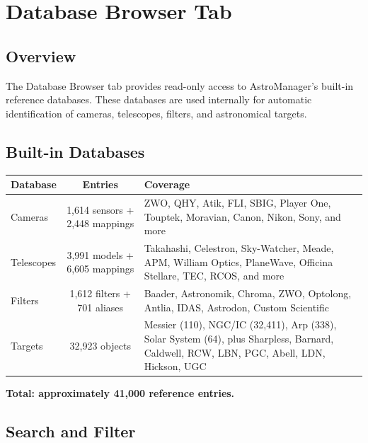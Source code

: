 \documentclass[11pt,a4paper]{article}
\begin{document}
\section{Database Browser Tab}
\label{sec:database}

\subsection{Overview}

The Database Browser tab provides read-only access to AstroManager's built-in reference databases. These databases are used internally for automatic identification of cameras, telescopes, filters, and astronomical targets.

\subsection{Built-in Databases}

\begin{center}
\begin{tabular}{lcp{7cm}}
\toprule
\textbf{Database} & \textbf{Entries} & \textbf{Coverage} \\
\midrule
Cameras & 1,614 sensors + 2,448 mappings & ZWO, QHY, Atik, FLI, SBIG, Player One, Touptek, Moravian, Canon, Nikon, Sony, and more \\
Telescopes & 3,991 models + 6,605 mappings & Takahashi, Celestron, Sky-Watcher, Meade, APM, William Optics, PlaneWave, Officina Stellare, TEC, RCOS, and more \\
Filters & 1,612 filters + 701 aliases & Baader, Astronomik, Chroma, ZWO, Optolong, Antlia, IDAS, Astrodon, Custom Scientific \\
Targets & 32,923 objects & Messier (110), NGC/IC (32,411), Arp (338), Solar System (64), plus Sharpless, Barnard, Caldwell, RCW, LBN, PGC, Abell, LDN, Hickson, UGC \\
\bottomrule
\end{tabular}
\end{center}

\textbf{Total: approximately 41,000 reference entries.}

\subsection{Search and Filter}
\end{document}
